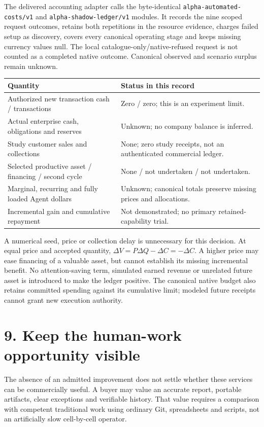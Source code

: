 \documentclass[11pt,letterpaper]{article}
\newcommand{\code}[1]{{\small\nolinkurl{#1}}}
\newcommand{\sect}[1]{\section*{#1}}
\begin{document}
The delivered accounting adapter calls the byte-identical \code{alpha-automated-costs/v1} and \code{alpha-shadow-ledger/v1} modules. It records the nine scoped request outcomes, retains both repetitions in the resource evidence, charges failed setup as discovery, covers every canonical operating stage and keeps missing currency values null. The local catalogue-only/native-refused request is not counted as a completed native outcome. Canonical observed and scenario surplus remain unknown.\cite{canonical}

\begin{tabularx}{\linewidth}{@{}p{.42\linewidth}Y@{}}
\toprule
\textbf{Quantity} & \textbf{Status in this record}\\
\midrule
Authorized new transaction cash / transactions & Zero / zero; this is an experiment limit.\\
Actual enterprise cash, obligations and reserves & Unknown; no company balance is inferred.\\
Study customer sales and collections & None; zero study receipts, not an authenticated commercial ledger.\\
Selected productive asset / financing / second cycle & None / not undertaken / not undertaken.\\
Marginal, recurring and fully loaded Agent dollars & Unknown; canonical totals preserve missing prices and allocations.\\
Incremental gain and cumulative repayment & Not demonstrated; no primary retained-capability trial.\\
\bottomrule
\end{tabularx}

A numerical seed, price or collection delay is unnecessary for this decision. At equal price and accepted quantity, \(\Delta V=P\Delta Q-\Delta C=-\Delta C\). A higher price may ease financing of a valuable asset, but cannot establish its missing incremental benefit. No attention-saving term, simulated earned revenue or unrelated future asset is introduced to make the ledger positive. The canonical native budget also retains committed spending against its cumulative limit; modeled future receipts cannot grant new execution authority.\cite{budget}

\sect{9. Keep the human-work opportunity visible}
The absence of an admitted improvement does not settle whether these services can be commercially useful. A buyer may value an accurate report, portable artifacts, clear exceptions and verifiable history. That value requires a comparison with competent traditional work using ordinary Git, spreadsheets and scripts, not an artificially slow cell-by-cell operator.
\end{document}

